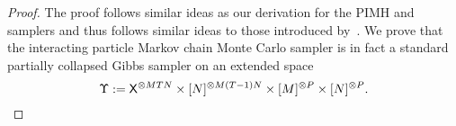 \begin{proof}
	The proof follows similar ideas as our derivation for the PIMH and \pg samplers and thus follows similar ideas
	to those introduced by~\cite{andrieu2010particle}. 
	We prove that the interacting particle Markov chain Monte Carlo sampler is in fact a standard partially collapsed Gibbs sampler \citep{van2008partially} on an extended space \[
	{\Upsilon := \mathsf{X}^{\otimes MTN} \times [N]^{\otimes M(T-1)N} \times [M]^{\otimes P} \times [N]^{\otimes P}}.
	\]

\end{proof}
